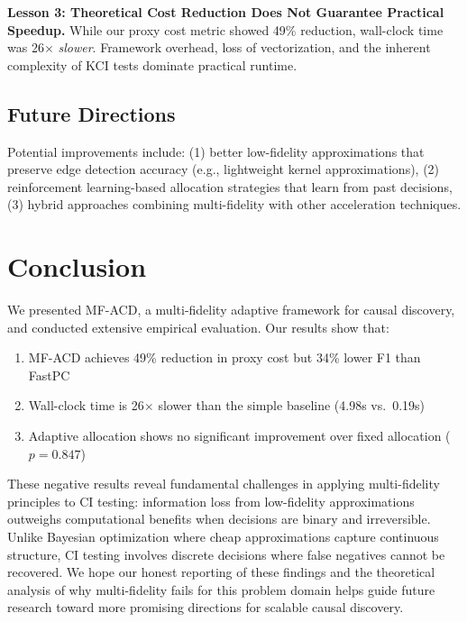 \documentclass{article}
\begin{document}
\textbf{Lesson 3: Theoretical Cost Reduction Does Not Guarantee Practical Speedup.} While our proxy cost metric showed 49\% reduction, wall-clock time was 26$\times$ \textit{slower}. Framework overhead, loss of vectorization, and the inherent complexity of KCI tests dominate practical runtime.

\subsection{Future Directions}

Potential improvements include: (1) better low-fidelity approximations that preserve edge detection accuracy (e.g., lightweight kernel approximations), (2) reinforcement learning-based allocation strategies that learn from past decisions, (3) hybrid approaches combining multi-fidelity with other acceleration techniques.

\section{Conclusion}

We presented MF-ACD, a multi-fidelity adaptive framework for causal discovery, and conducted extensive empirical evaluation. Our results show that:
\begin{enumerate}
    \item MF-ACD achieves 49\% reduction in proxy cost but 34\% lower F1 than FastPC
    \item Wall-clock time is 26$\times$ slower than the simple baseline (4.98s vs.~0.19s)
    \item Adaptive allocation shows no significant improvement over fixed allocation ($p = 0.847$)
\end{enumerate}

These negative results reveal fundamental challenges in applying multi-fidelity principles to CI testing: information loss from low-fidelity approximations outweighs computational benefits when decisions are binary and irreversible. Unlike Bayesian optimization where cheap approximations capture continuous structure, CI testing involves discrete decisions where false negatives cannot be recovered. We hope our honest reporting of these findings and the theoretical analysis of why multi-fidelity fails for this problem domain helps guide future research toward more promising directions for scalable causal discovery.



\end{document}
